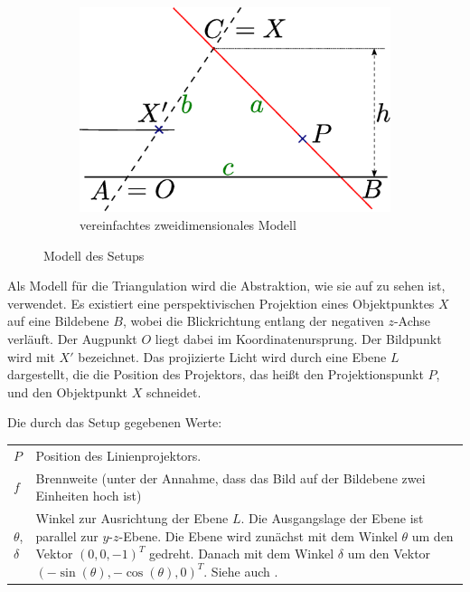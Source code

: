 \documentclass[ngerman,a4paper,parskip=half]{scrartcl}
\begin{document}
\begin{figure}
	\begin{subfigure}{0.45\textwidth}
		\includegraphics[width=\textwidth]{includes/triangulation2d}
		\caption{vereinfachtes zweidimensionales Modell}
		\label{fig:triangulation2d}
	\end{subfigure}
	\caption{Modell des Setups}
\end{figure}

Als Modell für die Triangulation wird die Abstraktion, wie sie auf  zu sehen ist, verwendet. Es existiert eine perspektivischen Projektion eines Objektpunktes $X$ auf eine Bildebene $B$, wobei die Blickrichtung entlang der negativen $z$-Achse verläuft. Der Augpunkt $O$ liegt dabei im Koordinatenursprung. Der Bildpunkt wird mit $X'$ bezeichnet. Das projizierte Licht wird durch eine Ebene $L$ dargestellt, die die Position des Projektors, das heißt den Projektionspunkt $P$, und den Objektpunkt $X$ schneidet.

Die durch das Setup gegebenen Werte:

\begin{tabular}{lp{12cm}}
	$P$                &
		Position des Linienprojektors.\\[0.5em]
	$f$                &
		Brennweite
		(unter der Annahme, dass das Bild auf der Bildebene zwei Einheiten hoch ist)\\[0.5em]
	$\theta$,$\delta$  &
		Winkel zur Ausrichtung der Ebene $L$. Die Ausgangslage der Ebene ist parallel zur $y$-$z$-Ebene. Die Ebene wird zunächst mit dem Winkel $\theta$ um den Vektor {\color{red} $(0,0,-1)^T$} gedreht. Danach mit dem Winkel $\delta$ um den Vektor {\color{red} $(-\sin(\theta), -\cos(\theta), 0)^T$}. Siehe auch \Fref{fig:triangulation_skew_pitch}.
\end{tabular}
\end{document}
